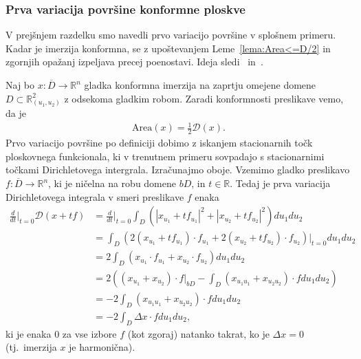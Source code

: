 \documentclass[12pt,a4paper,twoside]{article}
\theoremstyle{definition} %
\theoremstyle{plain} %
\numberwithin{equation}{section}  %
\newcommand{\R}{\mathbb R}
\begin{document}
\subsubsection{Prva variacija površine konformne ploskve}
% 
V prejšnjem razdelku smo navedli prvo variacijo površine v splošnem primeru. Kadar je imerzija konformna, se z upoštevanjem Leme~\ref{lema:Area<=D/2} in zgornjih opažanj izpeljava precej poenostavi. Ideja sledi~\cite[Section~6]{forstneric2021minimal} in~\cite[Section~2.2]{forstneric2021minimals}.

Naj bo $x \colon \overline{D} \to \R^{n}$ gladka konformna imerzija na zaprtju omejene domene $D \subset \R_{(u_1,u_2)}^2$ z odsekoma gladkim robom. 
Zaradi konformnosti preslikave vemo, da je
\begin{gather*}
\text{Area}(x) = \frac{1}{2} \mathcal{D}(x).
\end{gather*}
Prvo variacijo površine po definiciji dobimo z iskanjem stacionarnih točk ploskovnega funkcionala, ki v trenutnem primeru sovpadajo s stacionarnimi točkami Dirichletovega intergrala. Izračunajmo oboje. \newline
Vzemimo gladko preslikavo $f \colon \overline{D} \to \R^{n}$, ki je ničelna na robu domene $bD$, in $t \in \R$. Tedaj je prva variacija Dirichletovega integrala v smeri preslikave $f$ enaka
\begin{align*}
\frac{d}{dt} \Big|_{t=0} \mathcal{D}(x+tf) &= \frac{d}{dt} \Big|_{t=0} \int_{D} \left( |x_{u_1}+tf_{u_1}|^2 + |x_{u_2}+tf_{u_2}|^2 \right) du_1 du_2 \\
	&= \int_{D} \left( 2(x_{u_1}+tf_{u_1}) \cdot f_{u_1} + 2(x_{u_2}+tf_{u_2}) \cdot f_{u_2} \right) \big|_{t=0} du_1 du_2 \\
	&= 2 \int_{D} \left( x_{u_1} \cdot f_{u_1} + x_{u_2} \cdot f_{u_2} \right) du_1 du_2 \\
	&= 2 \left( (x_{u_1} + x_{u_2}) \cdot f \big|_{bD} - \int_{D} (x_{u_1 u_1} + x_{u_2 u_2}) \cdot f du_1 du_2 \right) \\
	&= -2 \int_{D} (x_{u_1 u_1} + x_{u_2 u_2}) \cdot f du_1 du_2 \\ 
	&= -2 \int_{D} \Delta{x} \cdot f du_1 du_2,
\end{align*}
ki je enaka $0$ za vse izbore $f$ (kot zgoraj) natanko takrat, ko je $\Delta{x} = 0$ (tj.~imerzija $x$ je harmonična). 
\end{document}
